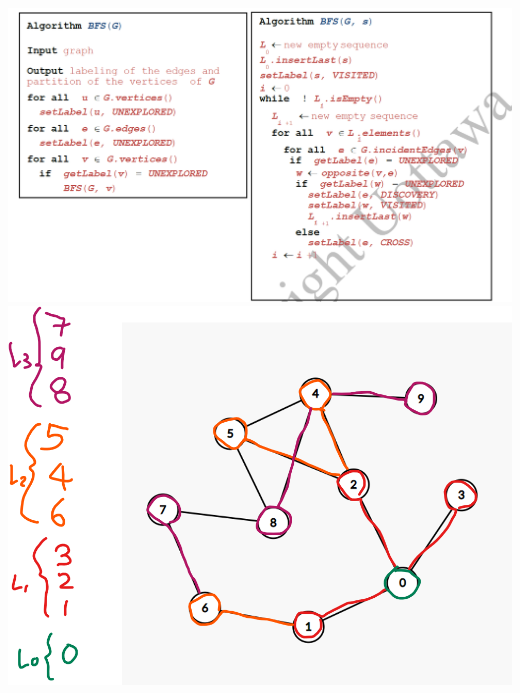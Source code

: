 \documentclass[12pt]{book}
\begin{document}
\begin{enumerate}
    \includegraphics[scale=0.50]{d8q4BFSalgorithms.png}\\
    
    \includegraphics[scale=0.70]{d8a4.png}\\
    
    
\end{enumerate}
\end{document}
